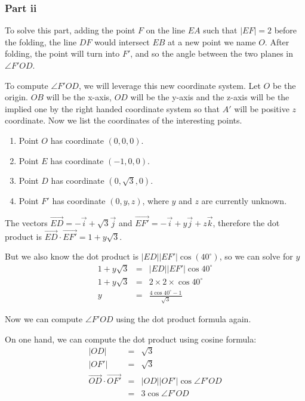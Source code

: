 \subsubsection*{Part ii}
To solve this part, adding the point $ F $ on the line $ EA $ such that $ |EF| = 2 $ before the folding, the line $ DF $ would intersect $ EB $ at a new point we name $ O $. After folding, the point will turn into $ F' $, and so the angle between the two planes in $ \angle F'OD $.

To compute $ \angle F'OD $, we will leverage this new coordinate system. Let $ O $ be the origin. $ OB $ will be the x-axis, $ OD $ will be the y-axis and the z-axis will be the implied one by the right handed coordinate system so that $ A' $ will be positive $ z $ coordinate. Now we list the coordinates of the interesting points.

\begin{enumerate}
    \item{Point $ O $ has coordinate $ (0, 0, 0) $. }
    \item{Point $ E $ has coordinate $ (-1, 0, 0) $. }
    \item{Point $ D $ has coordinate $ (0, \sqrt{3}, 0) $. }
    \item{Point $ F' $ has coordinate $ (0, y, z) $, where $ y $ and $ z $ are currently unknown. }
\end{enumerate}

The vectors $ \vec{ED} = -\vec{i} + \sqrt{3}\vec{j} $ and $ \vec{EF'} = -\vec{i} + y\vec{j} + z\vec{k} $, therefore the dot product is $ \vec{ED} \cdot \vec{EF'} = 1 + y\sqrt{3} $.

But we also know the dot product is $ |ED||EF'| \cos(40^\circ) $, so we can solve for $ y $
\begin{eqnarray*}
    1 + y\sqrt{3} &=& |ED||EF'| \cos 40^\circ             \\
    1 + y\sqrt{3} &=& 2 \times 2 \times \cos 40^\circ     \\
               y &=& \frac{4 \cos 40^\circ - 1}{\sqrt{3}}
\end{eqnarray*}

Now we can compute $ \angle F'OD $ using the dot product formula again.

On one hand, we can compute the dot product using cosine formula:
\begin{eqnarray*}
     |OD| &=& \sqrt{3} \\
    |OF'| &=& \sqrt{3} \\
    \vec{OD} \cdot \vec{OF'} &=& |OD||OF'| \cos \angle F'OD \\
    &=& 3 \cos \angle F'OD \\
\end{eqnarray*}

